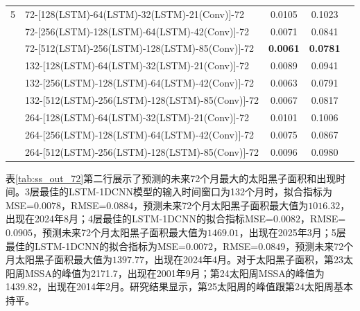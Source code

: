 \begin{table}[!htbp]
\begin{tabular}{clccc}
    \hline
    5 & 72-[128(LSTM)-64(LSTM)-32(LSTM)-21(Conv)]-72 & 0.0105 & 0.1023 \\
      & 72-[256(LSTM)-128(LSTM)-64(LSTM)-42(Conv)]-72 & 0.0071 & 0.0841 \\
      & 72-[512(LSTM)-256(LSTM)-128(LSTM)-85(Conv)]-72 & \textbf{0.0061} & \textbf{0.0781} \\
      & 132-[128(LSTM)-64(LSTM)-32(LSTM)-21(Conv)]-72 & 0.0089 & 0.0941 \\
      & 132-[256(LSTM)-128(LSTM)-64(LSTM)-42(Conv)]-72 & 0.0063 & 0.0791 \\
      & 132-[512(LSTM)-256(LSTM)-128(LSTM)-85(Conv)]-72 & 0.0067 & 0.0817 \\
      & 264-[128(LSTM)-64(LSTM)-32(LSTM)-21(Conv)]-72 & 0.0101 & 0.1006 \\
      & 264-[256(LSTM)-128(LSTM)-64(LSTM)-42(Conv)]-72 & 0.0075 & 0.0867 \\
      & 264-[512(LSTM)-256(LSTM)-128(LSTM)-85(Conv)]-72 & 0.0096 & 0.0980 \\
    \bottomrule
\end{tabular}
\end{table}

表\ref{tab:ss_out_72}第二行展示了预测的未来72个月最大的太阳黑子面积和出现时间。3层最佳的LSTM-1DCNN模型的输入时间窗口为132个月时，拟合指标为MSE=$0.0078$，RMSE=$0.0884$，预测未来72个月太阳黑子面积最大值为$1016.32$，出现在2024年8月；4层最佳的LSTM-1DCNN的拟合指标MSE=$0.0082$，RMSE=$0.0905$，预测未来72个月太阳黑子面积最大值为$1469.01$，出现在2025年3月；5层最佳的LSTM-1DCNN的拟合指标为MSE=$0.0072$，RMSE=$0.0849$，预测未来72个月太阳黑子面积最大值为$1397.77$，出现在2024年4月。对于太阳黑子面积，第23太阳周MSSA的峰值为2171.7，出现在2001年9月；第24太阳周MSSA的峰值为1439.82，出现在2014年2月。研究结果显示，第25太阳周的峰值跟第24太阳周基本持平。 

